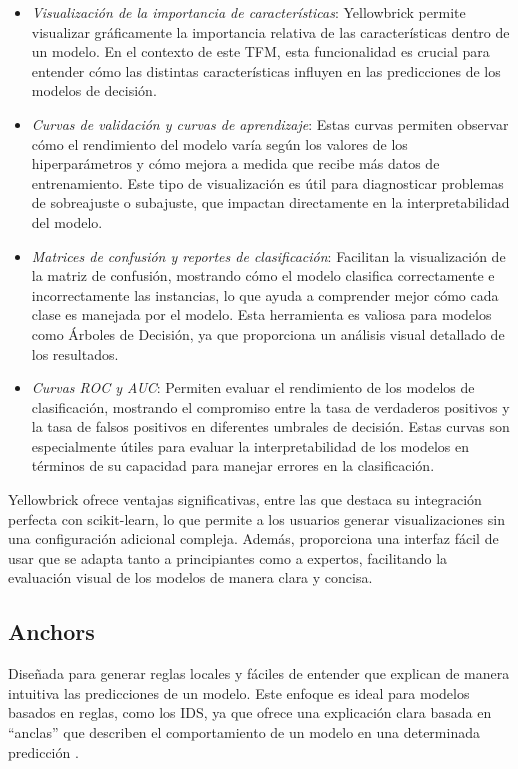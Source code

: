 \begin{itemize}
    \item \textit{Visualización de la importancia de características}: Yellowbrick permite visualizar gráficamente la importancia relativa de las características dentro de un modelo. En el contexto de este TFM, esta funcionalidad es crucial para entender cómo las distintas características influyen en las predicciones de los modelos de decisión.
    
    \item \textit{Curvas de validación y curvas de aprendizaje}: Estas curvas permiten observar cómo el rendimiento del modelo varía según los valores de los hiperparámetros y cómo mejora a medida que recibe más datos de entrenamiento. Este tipo de visualización es útil para diagnosticar problemas de sobreajuste o subajuste, que impactan directamente en la interpretabilidad del modelo.

    \item \textit{Matrices de confusión y reportes de clasificación}: Facilitan la visualización de la matriz de confusión, mostrando cómo el modelo clasifica correctamente e incorrectamente las instancias, lo que ayuda a comprender mejor cómo cada clase es manejada por el modelo. Esta herramienta es valiosa para modelos como Árboles de Decisión, ya que proporciona un análisis visual detallado de los resultados.

    \item \textit{Curvas ROC y AUC}: Permiten evaluar el rendimiento de los modelos de clasificación, mostrando el compromiso entre la tasa de verdaderos positivos y la tasa de falsos positivos en diferentes umbrales de decisión. Estas curvas son especialmente útiles para evaluar la interpretabilidad de los modelos en términos de su capacidad para manejar errores en la clasificación.
\end{itemize}

Yellowbrick ofrece ventajas significativas, entre las que destaca su integración perfecta con scikit-learn, lo que permite a los usuarios generar visualizaciones sin una configuración adicional compleja. Además, proporciona una interfaz fácil de usar que se adapta tanto a principiantes como a expertos, facilitando la evaluación visual de los modelos de manera clara y concisa.



\subsection{Anchors}
Diseñada para generar reglas locales y fáciles de entender que explican de manera intuitiva las predicciones de un modelo. Este enfoque es ideal para modelos basados en reglas, como los IDS, ya que ofrece una explicación clara basada en ``anclas'' que describen el comportamiento de un modelo en una determinada predicción \cite{ribeiro2018anchors}.

